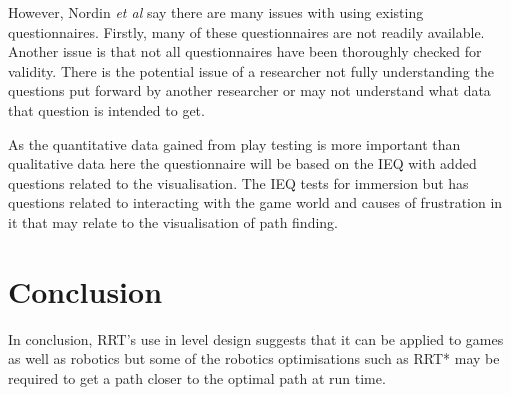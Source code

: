 \documentclass[journal]{IEEEtran}
\begin{document}
However, Nordin \textit{et al} say there are many issues with using existing questionnaires. Firstly, many of these questionnaires are not readily available. Another issue is that not all questionnaires have been thoroughly checked for validity. There is the potential issue of a researcher not fully understanding the questions put forward by another researcher or may not understand what data that question is intended to get.

As the quantitative data gained from play testing is more important than qualitative data here the questionnaire will be based on the IEQ with added questions related to the visualisation. The IEQ tests for immersion but has questions related to interacting with the game world and causes of frustration in it that may relate to the visualisation of path finding.



\section{Conclusion}
In conclusion, RRT's use in level design suggests that it can be applied to games as well as robotics but some of the robotics optimisations such as RRT* may be required to get a path closer to the optimal path at run time.







\end{document}
